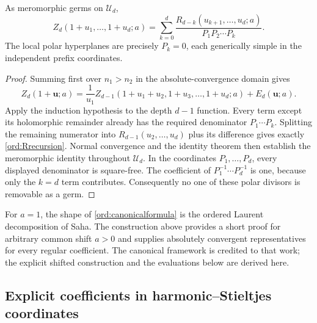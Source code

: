 \begin{theorem}
\label{ord:canonical}
As meromorphic germs on $\mathcal U_d$,
\begin{equation}\label{ord:canonicalformula}
 \boxed{\displaystyle
 Z_d(1+u_1,\ldots,1+u_d;a)
 =\sum_{k=0}^{d}
 \frac{R_{d-k}(u_{k+1},\ldots,u_d;a)}{P_1P_2\cdots P_k}.}
\end{equation}
The local polar hyperplanes are precisely $P_k=0$, each generically
simple in the independent prefix coordinates.
\end{theorem}

\begin{proof}
Summing first over $n_1>n_2$ in the absolute-convergence domain gives
\[
 Z_d(1+\mathbf u;a)
 =\frac1{u_1}Z_{d-1}(1+u_1+u_2,1+u_3,\ldots,1+u_d;a)
       +E_d(\mathbf u;a).
\]
Apply the induction hypothesis to the depth $d-1$ function. Every term
except its holomorphic remainder already has the required denominator
$P_1\cdots P_k$. Splitting the remaining numerator into
$R_{d-1}(u_2,\ldots,u_d)$ plus its difference gives exactly
\eqref{ord:Rrecursion}. Normal convergence and the identity theorem then
establish the meromorphic identity throughout $\mathcal U_d$.
In the coordinates $P_1,\ldots,P_d$, every displayed denominator is
square-free. The coefficient of $P_1^{-1}\cdots P_d^{-1}$ is one,
because only the $k=d$ term contributes. Consequently no one of these
polar divisors is removable as a germ.
\end{proof}

For $a=1$, the shape of \eqref{ord:canonicalformula} is the ordered
Laurent decomposition of Saha\cite[Theorem 2]{Saha}. The construction above
provides a short proof for arbitrary common shift $a>0$ and supplies
absolutely convergent representatives for every regular coefficient.
The canonical framework is credited to that work; the explicit shifted
construction and the evaluations below are derived here.

\subsection{Explicit coefficients in harmonic--Stieltjes coordinates}

